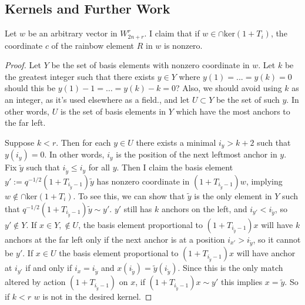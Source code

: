 \documentclass{amsart}
\begin{document}
\subsection{Kernels and Further Work}
\begin{proposition}\label{Represented}
	Let $w$ be an arbitrary vector in $W_{2n+r}^r$. I claim that if $w\in \cap\text{ker}(1+T_i)$, the coordinate $c$ of the rainbow element $R$ in $w$ is nonzero.
\end{proposition}	
\begin{proof}
  Let $Y$ be the set of basis elements with nonzero coordinate in $w$. Let $k$ be the greatest integer such that there exists $y\in Y$ where $y(1)=...=y(k)=0$ {\color{magenta} should this be $y(1)-1 = \dots = y(k) - k = 0$? Also, we should avoid using $k$ as an integer, as it's used elsewhere as a field.}, and let $U\subset Y$ be the set of such $y$. In other words, $U$ is the set of basis elements in $Y$ which have the most anchors to the far left.
	
	Suppose $k<r$. Then for each $y\in U$ there exists a minimal $i_y>k+2$ such that $y(i_y)=0$. In other words, $i_y$ is the position of the next leftmost anchor in $y$.  Fix $\tilde{y}$ such that $i_{\tilde{y}}\leq i_y$ for all $y$. Then I claim the basis element $y':=q^{-1/2}(1+T_{i_{\tilde{y}}-1})\tilde{y}$ has nonzero coordinate in $(1+T_{i_{\tilde{y}}-1})w$, implying $w\not\in \cap\text{ker}(1+T_i)$. To see this, we can show that $\tilde{y}$ is the only element in $Y$ such that $q^{-1/2}(1+T_{i_{\tilde{y}}-1})\tilde{y}\sim y'$. $y'$ still has $k$ anchors on the left, and $i_{y'}<i_{\tilde{y}}$, so $y'\not\in Y$. If $x\in Y,\not\in U$, the basis element proportional to $(1+T_{i_{\tilde{y}}-1})x$ will have $k$ anchors at the far left only if the next anchor is at a position $i_{x'}>i_{\tilde{y}}$, so it cannot be $y'$. If $x\in U$ the basis element proportional to $(1+T_{i_{\tilde{y}}-1})x$ will have anchor at $i_{y'}$ if and only if $i_x=i_{\tilde{y}}$ and $x(i_{\tilde{y}})=\tilde{y}(i_{\tilde{y}})$. Since this is the only match altered by action $(1+T_{i_{\tilde{y}}-1})$ on $x$, if $(1+T_{i_{\tilde{y}}-1})x\sim y'$ this implies $x=\tilde{y}$. So if $k<r$ $w$ is not in the desired kernel.
	

\end{proof}
\end{document}
